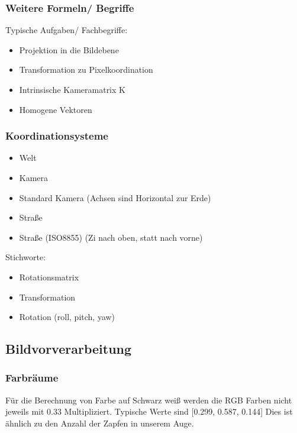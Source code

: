 \documentclass[a4paper]{article}
\begin{document}
\subsubsection{Weitere Formeln/ Begriffe}

Typische Aufgaben/ Fachbegriffe:

\begin{itemize}
    \item Projektion in die Bildebene
    \item Transformation zu Pixelkoordination
    \item Intrinsische Kameramatrix K
    \item Homogene Vektoren
\end{itemize}

\subsubsection{Koordinationsysteme}

\begin{itemize}
    \item Welt
    \item Kamera
    \item Standard Kamera (Achsen sind Horizontal zur Erde)
    \item Straße
    \item Straße (ISO8855) (Zi nach oben, statt nach vorne)
\end{itemize}

Stichworte:

\begin{itemize}
    \item Rotationsmatrix
    \item Transformation
    \item Rotation (roll, pitch, yaw)
\end{itemize}

\subsection{Bildvorverarbeitung}

\subsubsection{Farbräume}

Für die Berechnung von Farbe auf Schwarz weiß werden die RGB Farben nicht jeweils mit 0.33 Multipliziert. Typische Werte sind [0.299, 0.587, 0.144] Dies ist ähnlich zu den Anzahl der Zapfen in unserem Auge.
\end{document}
